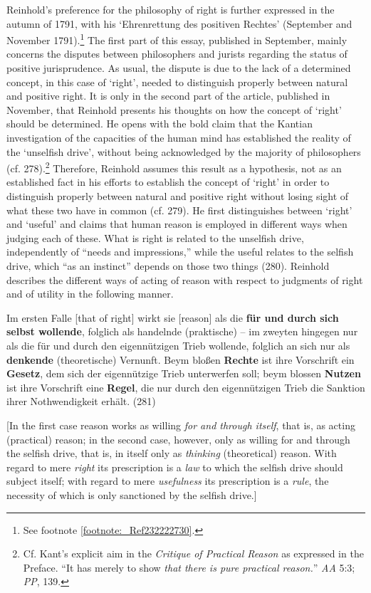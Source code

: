  Reinhold's preference for the philosophy of right is further expressed in the autumn of 1791, with his `Ehrenrettung des positiven Rechtes' (September and November 1791).\footnote{ See footnote \ref{footnote:_Ref232222730}. } The first part of this essay, published in September, mainly concerns the disputes between philosophers and jurists regarding the status of positive jurisprudence. As usual, the dispute is due to the lack of a determined concept, in this case of `right', needed to distinguish properly between natural and positive right. It is only in the second part of the article, published in November, that Reinhold presents his thoughts on how the concept of `right' should be determined. He opens with the bold claim that the Kantian investigation of the capacities of the human mind has established the reality of the `unselfish drive', without being acknowledged by the majority of philosophers (cf. 278).\footnote{ Cf. Kant's explicit aim in the \textit{Critique of Practical Reason} as expressed in the Preface. ``It has merely to show \textit{that there is pure practical reason.}'' \textit{AA} 5:3; \textit{PP}, 139. } Therefore, Reinhold assumes this result as a hypothesis, not as an established fact in his efforts to establish the concept of `right' in order to distinguish properly between natural and positive right without losing sight of what these two have in common (cf. 279). He first distinguishes between `right' and `useful' and claims that human reason is employed in different ways when judging each of these. What is right is related to the unselfish drive, independently of ``needs and impressions,'' while the useful relates to the selfish drive, which ``as an instinct'' depends on those two things (280). Reinhold describes the different ways of acting of reason with respect to judgments of right and of utility in the following manner. 

Im ersten Falle [that of right] wirkt sie [reason] als die \textbf{f\"{u}r und durch sich selbst wollende}, folglich als handelnde (praktische) {--} im zweyten hingegen nur als die f\"{u}r und durch den eigenn\"{u}tzigen Trieb wollende, folglich an sich nur als \textbf{denkende} (theoretische) Vernunft. Beym blo\ss{}en \textbf{Rechte} ist ihre Vorschrift ein \textbf{Gesetz}, dem sich der eigenn\"{u}tzige Trieb unterwerfen soll; beym blossen \textbf{Nutzen} ist ihre Vorschrift eine \textbf{Regel}, die nur durch den eigenn\"{u}tzigen Trieb die Sanktion ihrer Nothwendigkeit erh\"{a}lt. (281)

[In the first case reason works as willing \textit{for and through itself}, that is, as acting (practical) reason; in the second case, however, only as willing for and through the selfish drive, that is, in itself only as \textit{thinking} (theoretical) reason. With regard to mere \textit{right} its prescription is a \textit{law} to which the selfish drive should subject itself; with regard to mere \textit{usefulness} its prescription is a \textit{rule}, the necessity of which is only sanctioned by the selfish drive.]

